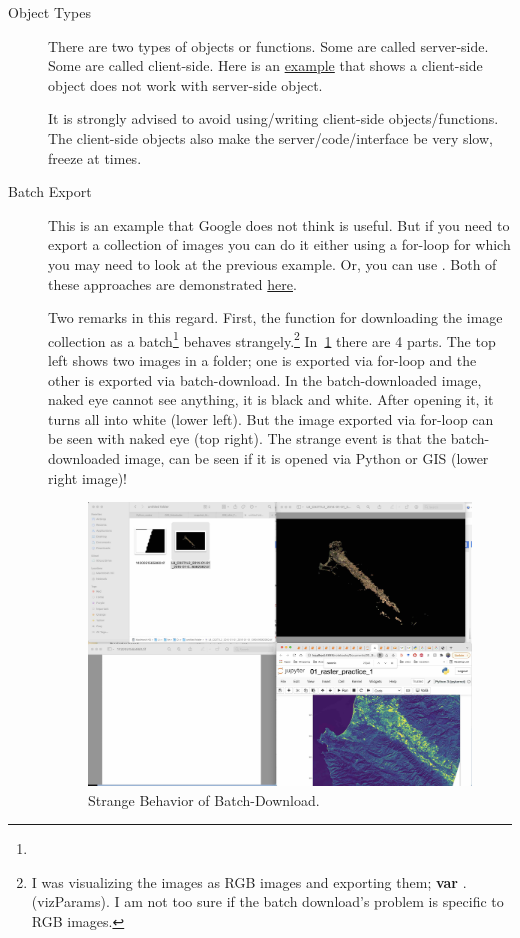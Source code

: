 \begin{description}
\item [Object Types] There are two types of objects or functions.
Some are called server-side. Some are called client-side.
Here is an \href{https://code.earthengine.google.com/?scriptPath=users\%2Fhnoorazar\%2FGEE_Mini_Tutorial\%3AobjectTypeForLoop}{example}  
that shows a client-side object does not work with server-side object.

It is strongly advised to avoid using/writing client-side
objects/functions. The client-side objects also make the
server/code/interface be very slow, freeze at times.

\item [Batch Export] This is an example that Google does not think
is useful. But if you need to export a collection of images you can do it
either using a for-loop for which you may need to look at the previous example.
Or, you can use . 
Both of these approaches are demonstrated \href{https://code.earthengine.google.com/?scriptPath=users\%2Fhnoorazar\%2FGEE_Mini_Tutorial\%3ABatchExport}{here}.

Two remarks in this regard. First, the function for downloading the image 
collection as a batch\footnote{} 
behaves strangely.\footnote{I was visualizing the images as RGB 
images and exporting them; \textbf{var} 
 . 
(vizParams). I am not too sure if the 
batch download's problem is specific to RGB images.}
In~\cref{fig:strangeBatch} there are 4 parts. The top left shows
two images in a folder; one is exported via for-loop and the other
is exported via batch-download. In the batch-downloaded image,
naked eye cannot see anything, it is black and white. After opening it,
it turns all into white (lower left). But the image exported via for-loop
can be seen with naked eye (top right). The strange event is that the 
batch-downloaded image, can be seen if it is opened via Python or 
GIS (lower right image)!

\begin{figure}[htb]
  \centering
  \includegraphics[width=.9\textwidth]{figures/strangeBatch}
  \caption{Strange Behavior of Batch-Download.}
  \label{fig:strangeBatch}
\end{figure}


\end{description}
